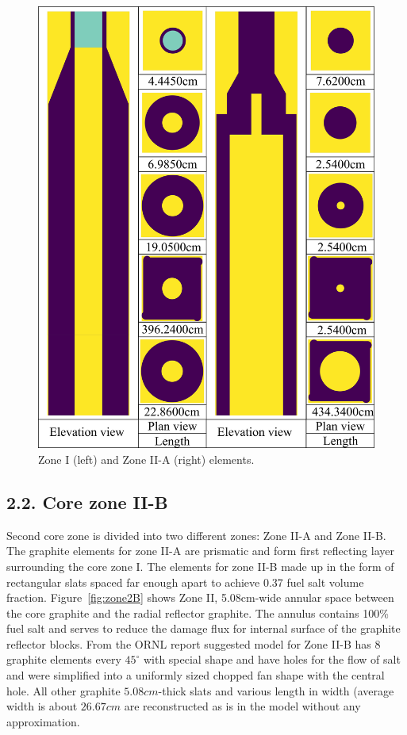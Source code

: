 \documentclass{anstrans}
\begin{document}
\begin{figure}[h] %
  \centering
  \includegraphics[width=0.96\linewidth]{figure_2_4.png}
  \caption{Zone I (left) and Zone II-A (right) elements.}
  \label{fig:zone12A}
\end{figure}

\subsection{2.2. Core zone II-B}
Second core zone is divided into two different zones: Zone II-A and Zone II-B. The graphite elements for zone II-A are prismatic and form first reflecting layer surrounding the core zone I. The elements for zone II-B made up in the form of rectangular slats spaced far enough apart to achieve 0.37 fuel salt volume fraction. Figure~\ref{fig:zone2B} shows Zone II, 5.08cm-wide annular space between the core graphite and the radial reflector graphite. The annulus contains 100\% fuel salt and serves to reduce the damage flux for internal surface of the graphite reflector blocks. From the ORNL report suggested model for Zone II-B has 8 graphite elements every $45^\circ$ with special shape and have holes for the flow of salt and were simplified into a uniformly sized chopped fan shape with the central hole. All other graphite $5.08cm$-thick slats and various length in width (average width is about $26.67cm$ are reconstructed as is in the model without any approximation. 
\end{document}
